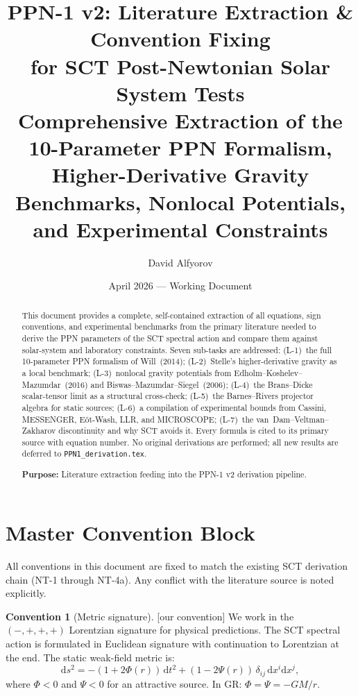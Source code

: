 \documentclass[11pt,a4paper]{article}
\title{\textbf{PPN-1 v2: Literature Extraction \& Convention Fixing\\[4pt]
       for SCT Post-Newtonian Solar System Tests}\\[8pt]
       \large Comprehensive Extraction of the 10-Parameter PPN Formalism,\\
       Higher-Derivative Gravity Benchmarks, Nonlocal Potentials,\\
       and Experimental Constraints}
\author{David Alfyorov}
\date{April 2026 --- Working Document}
\theoremstyle{plain}
\theoremstyle{definition}
\newtheorem{convention}[theorem]{Convention}
\theoremstyle{remark}
\newcommand{\dd}{\mathrm{d}}
\newcommand{\oursign}{\textcolor{teal!80!black}{\textsf{[our convention]}}}
\begin{document}
\maketitle

\begin{abstract}
This document provides a complete, self-contained extraction of all
equations, sign conventions, and experimental benchmarks from the
primary literature needed to derive the PPN parameters of the SCT
spectral action and compare them against solar-system and laboratory
constraints.  Seven sub-tasks are addressed:
(L-1)~the full 10-parameter PPN formalism of Will~(2014);
(L-2)~Stelle's higher-derivative gravity as a local benchmark;
(L-3)~nonlocal gravity potentials from Edholm--Koshelev--Mazumdar~(2016)
and Biswas--Mazumdar--Siegel~(2006);
(L-4)~the Brans--Dicke scalar-tensor limit as a structural cross-check;
(L-5)~the Barnes--Rivers projector algebra for static sources;
(L-6)~a compilation of experimental bounds from Cassini, MESSENGER,
E\"ot-Wash, LLR, and MICROSCOPE;
(L-7)~the van~Dam--Veltman--Zakharov discontinuity and why SCT avoids it.
Every formula is cited to its primary source with equation number.
No original derivations are performed; all new results are deferred
to \texttt{PPN1\_derivation.tex}.

\medskip\noindent
\textbf{Purpose:} Literature extraction feeding into the PPN-1 v2
derivation pipeline.
\end{abstract}

\tableofcontents
\newpage

\section{Master Convention Block}\label{sec:master-conventions}

All conventions in this document are fixed to match the existing SCT
derivation chain (NT-1 through NT-4a).  Any conflict with the
literature source is noted explicitly.

\begin{convention}[Metric signature]\label{conv:signature}
\oursign\;
We work in the $(-,+,+,+)$ Lorentzian signature for physical
predictions.  The SCT spectral action is formulated in Euclidean
signature with continuation to Lorentzian at the end.  The static
weak-field metric is:
\begin{equation}\label{eq:static-metric}
  \dd s^2 = -(1 + 2\Phi(r))\,\dd t^2
  + (1 - 2\Psi(r))\,\delta_{ij}\,\dd x^i\dd x^j,
\end{equation}
where $\Phi < 0$ and $\Psi < 0$ for an attractive source.  In GR:
$\Phi = \Psi = -GM/r$.
\end{convention}
\end{document}
